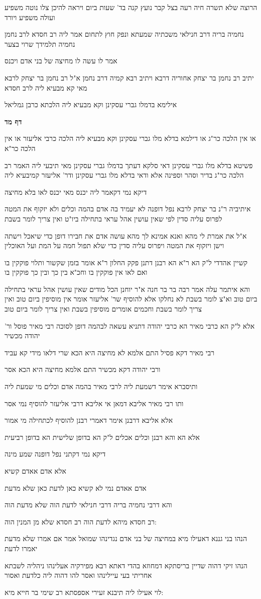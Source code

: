 \documentclass[12pt, openany]{book}
\newcommand{\sethebfont}{
\fontsize{10.5pt}{21.0pt} \selectfont
}
\newcommand{\textblock}[1]{
{\sethebfont #1\\}	
}
\newcommand{\sectname}{}
\newcommand{\newsection}[1]{
	\addcontentsline{toc}{section}{#1}
	\renewcommand{\sectname}{#1}	
	\vspace{-\baselineskip}
	\begin{center}
		\textbf{%
\fontsize{16pt}{16pt}\selectfont
			#1}
	\end{center}
	\vspace{-\baselineskip}
	\nopagebreak
}
\begin{document}
\textblock{הרוצה שלא תשרה חיה רעה בצל קבר נועץ קנה בד' שעות ביום ויראה להיכן צלו נוטה משפיע ועולה משפיע ויורד}
\textblock{נחמיה בריה דרב חנילאי משכתיה שמעתא ונפק חוץ לתחום אמר ליה רב חסדא לרב נחמן נחמיה תלמידך שרוי בצער}
\textblock{אמר לו עשה לו מחיצה של בני אדם ויכנס}
\textblock{יתיב רב נחמן בר יצחק אחוריה דרבא ויתיב רבא קמיה דרב נחמן א"ל רב נחמן בר יצחק לרבא מאי קא מבעיא ליה לרב חסדא}
\textblock{אילימא בדמלו גברי עסקינן וקא מבעיא ליה הלכתא כרבן גמליאל}
\newsection{דף מד}
\textblock{או אין הלכה כר"ג או דילמא בדלא מלו גברי עסקינן וקא מבעיא ליה הלכה כרבי אליעזר או אין הלכה כר"א}
\textblock{פשיטא בדלא מלו גברי עסקינן דאי סלקא דעתך בדמלו גברי עסקינן מאי תיבעי ליה האמר רב הלכה כר"ג בדיר וסהר וספינה אלא ודאי בדלא מלו גברי עסקינן ודר' אליעזר קמיבעיא ליה}
\textblock{דיקא נמי דקאמר ליה יכנס מאי יכנס לאו בלא מחיצה}
\textblock{איתיביה ר"נ בר יצחק לרבא נפל דופנה לא יעמיד בה אדם בהמה וכלים ולא יזקוף את המטה לפרוס עליה סדין לפי שאין עושין אהל עראי בתחילה ביו"ט ואין צריך לומר בשבת}
\textblock{א"ל את אמרת לי מהא ואנא אמינא לך מהא עושה אדם את חבירו דופן כדי שיאכל וישתה וישן ויזקוף את המטה ויפרוס עליה סדין כדי שלא תפול חמה על המת ועל האוכלין}
\textblock{קשיין אהדדי ל"ק הא ר"א הא רבנן דתנן פקק החלון ר"א אומר בזמן שקשור ותלוי פוקקין בו ואם לאו אין פוקקין בו וחכ"א בין כך ובין כך פוקקין בו}
\textblock{והא איתמר עלה אמר רבה בר בר חנה א"ר יוחנן הכל מודים שאין עושין אהל עראי בתחילה ביום טוב וא"צ לומר בשבת לא נחלקו אלא להוסיף שר' אליעזר אומר אין מוסיפין ביום טוב ואין צריך לומר בשבת וחכמים אומרים מוסיפין בשבת ואין צריך לומר ביום טוב}
\textblock{אלא ל"ק הא כרבי מאיר הא כרבי יהודה דתניא עשאה לבהמה דופן לסוכה רבי מאיר פוסל ור' יהודה מכשיר}
\textblock{רבי מאיר דקא פסיל התם אלמא לא מחיצה היא הכא שרי דלאו מידי קא עביד}
\textblock{ורבי יהודה דקא מכשיר התם אלמא מחיצה היא הכא אסר}
\textblock{ותיסברא אימר דשמעת ליה לרבי מאיר בהמה אדם וכלים מי שמעת ליה}
\textblock{ותו רבי מאיר אליבא דמאן אי אליבא דרבי אליעזר להוסיף נמי אסר}
\textblock{אלא אליבא דרבנן אימר דאמרי רבנן להוסיף לכתחילה מי אמור}
\textblock{אלא הא והא רבנן וכלים אכלים ל"ק הא בדופן שלישית הא בדופן רביעית}
\textblock{דיקא נמי דקתני נפל דופנה שמע מינה}
\textblock{אלא אדם אאדם קשיא}
\textblock{אדם אאדם נמי לא קשיא כאן לדעת כאן שלא מדעת}
\textblock{והא דרבי נחמיה בריה דרבי חנילאי לדעת הוה שלא מדעת הוה}
\textblock{רב חסדא מיהא לדעת הוה רב חסדא שלא מן המנין הוה:}
\textblock{הנהו בני גננא דאעילו מיא במחיצה של בני אדם נגדינהו שמואל אמר אם אמרו שלא מדעת יאמרו לדעת}
\textblock{הנהו זיקי דהוה שדיין בריסתקא דמחוזא בהדי דאתא רבא מפירקיה אעלינהו ניהליה לשבתא אחריתי בעי עיילינהו ואסר להו דהוה ליה כלדעת ואסור}
\textblock{לוי אעילו ליה תיבנא זעירי אספסתא רב שימי בר חייא מיא:}
\end{document}
